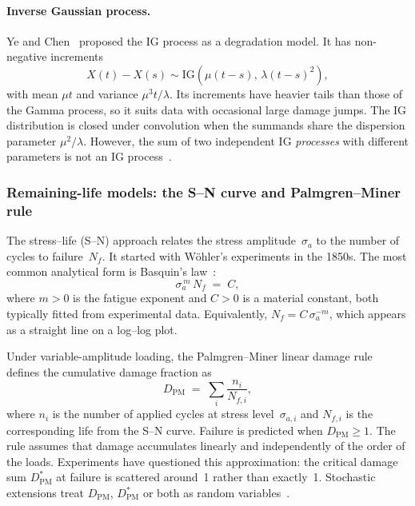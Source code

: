 \documentclass[11pt,a4paper]{article}
\theoremstyle{plain}
\theoremstyle{definition}
\theoremstyle{remark}
\begin{document}
\paragraph{Inverse Gaussian process.}
Ye and Chen~\cite{YeChen2014} proposed the IG process as a degradation model.
It has non-negative increments
\begin{equation}
  X(t)-X(s) \sim \mathrm{IG}(\mu(t-s),\,\lambda(t-s)^2),
\end{equation}
with mean $\mu t$ and variance $\mu^3 t/\lambda$.
Its increments have heavier tails than those of the Gamma process, so it suits data with occasional large damage jumps.
The IG distribution is closed under convolution when the summands share the dispersion parameter $\mu^2/\lambda$.
However, the sum of two independent IG \emph{processes} with different parameters is not an IG process~\cite{YeChen2014}.

\subsubsection{Remaining-life models: the S--N curve and Palmgren--Miner rule}
\label{sec:remaining_life}

The stress--life (S--N) approach relates the stress amplitude~$\sigma_a$ to the number of cycles to failure~$N_f$.
It started with W\"ohler's experiments in the 1850s.
The most common analytical form is Basquin's law~\cite{Basquin1910}:
\begin{equation}\label{eq:basquin}
  \sigma_a^{\,m}\, N_f \;=\; C,
\end{equation}
where $m>0$ is the fatigue exponent and $C>0$ is a material constant, both typically fitted from experimental data.
Equivalently, $N_f = C\,\sigma_a^{-m}$, which appears as a straight line on a log--log plot.

Under variable-amplitude loading, the Palmgren--Miner linear damage rule~\cite{Palmgren1924,Miner1945} defines the cumulative damage fraction as
\begin{equation}\label{eq:miner}
  D_{\mathrm{PM}} \;=\; \sum_{i} \frac{n_i}{N_{f,i}},
\end{equation}
where $n_i$ is the number of applied cycles at stress level~$\sigma_{a,i}$ and $N_{f,i}$ is the corresponding life from the S--N curve.
Failure is predicted when $D_{\mathrm{PM}} \ge 1$.
The rule assumes that damage accumulates linearly and independently of the order of the loads.
Experiments have questioned this approximation: the critical damage sum $D_{\mathrm{PM}}^*$ at failure is scattered around~1 rather than exactly~1.
Stochastic extensions treat $D_{\mathrm{PM}}$, $D_{\mathrm{PM}}^*$ or both as random variables~\cite{Shen1980,CastilloFernandezCanteli2009,Hilow2017,BohmEtAl2021,MunizCalvente2022}.
\end{document}
